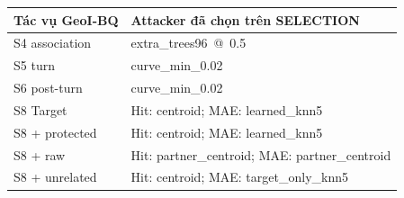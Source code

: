 \par\smallskip\noindent\begin{tabularx}{\linewidth}{@{}P{3cm}X@{}}\toprule
\textbf{Tác vụ GeoI-BQ} & \textbf{Attacker đã chọn trên SELECTION} \\
\midrule
S4 association & extra\_trees96\, @\, 0.5 \\
S5 turn & curve\_min\_0.02 \\
S6 post-turn & curve\_min\_0.02 \\
S8 Target & Hit: centroid; MAE: learned\_knn5 \\
S8 + protected & Hit: centroid; MAE: learned\_knn5 \\
S8 + raw & Hit: partner\_centroid; MAE: partner\_centroid \\
S8 + unrelated & Hit: centroid; MAE: target\_only\_knn5 \\
\bottomrule\end{tabularx}\par\smallskip
